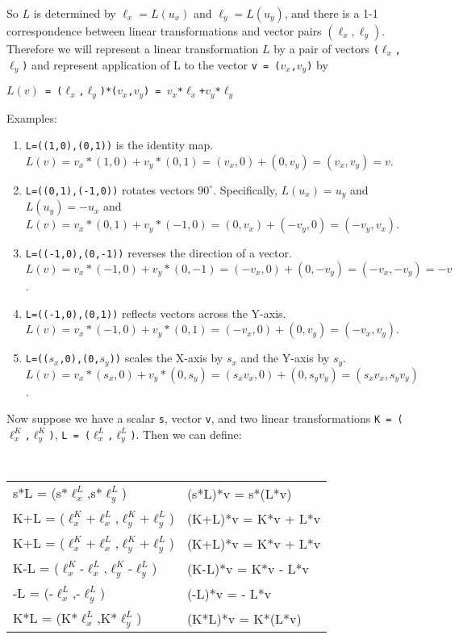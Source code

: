 \documentclass[12pt]{article}
\begin{document}
So $L$ is determined by $\ell_x = L(u_x)$ and $\ell_y = L(u_y)$,
and there is a 1-1 correspondence between linear transformations
and vector pairs $(\ell_x,\ell_y)$.  Therefore we will represent a linear
transformation $L$ by a pair of vectors {\tt ($\ell_x$,$\ell_y$)}
and represent application of L to the vector {\tt v = ($v_x$,$v_y$)} by \\
\centerline{\tt $L(v)$ = ($\ell_x$,$\ell_y$)*($v_x$,$v_y$) =
             $v_x$*$\ell_x$+$v_y$*$\ell_y$}

Examples:
\begin{enumerate}
\item {\tt L=((1,0),(0,1))} is the identity map.
$L(v)=v_x*(1,0) + v_y*(0,1) = (v_x,0)+(0,v_y) = (v_x,v_y) = v$.
\item {\tt L=((0,1),(-1,0))} rotates vectors $90^\circ$.
Specifically, $L(u_x)=u_y$ and $L(u_y)=-u_x$ and
$L(v)=v_x*(0,1) + v_y*(-1,0) = (0,v_x)+(-v_y,0) = (-v_y,v_x)$.
\item {\tt L=((-1,0),(0,-1))} reverses the direction of a vector.
$L(v)=v_x*(-1,0) + v_y*(0,-1) = (-v_x,0)+(0,-v_y) = (-v_x,-v_y) = -v$.
\item {\tt L=((-1,0),(0,1))} reflects vectors across the Y-axis.
$L(v)=v_x*(-1,0) + v_y*(0,1) = (-v_x,0)+(0,v_y) = (-v_x,v_y)$.
\item {\tt L=(($s_x$,0),(0,$s_y$))} scales the X-axis by $s_x$ and
the Y-axis by $s_y$. \\
$L(v)=v_x*(s_x,0) + v_y*(0,s_y)
     = (s_x v_x,0)+(0,s_y v_y)= (s_x v_x, s_y v_y)$.
\end{enumerate}

Now suppose we have a scalar {\tt s}, vector {\tt v},
and two linear transformations
{\tt K = ($\ell^K_x$,$\ell^K_y$)},
{\tt L = ($\ell^L_x$,$\ell^L_y$)}.  Then we can define:
\begin{center}
\tt
\begin{tabular}{l@{~so that~}l}
s*L = (s*$\ell^L_x$,s*$\ell^L_y$)
	 & (s*L)*v = s*(L*v) \\[0.3ex]
K+L = ($\ell^K_x$+$\ell^L_x$,$\ell^K_y$+$\ell^L_y$)
	 & (K+L)*v = K*v + L*v \\[0.3ex]
K+L = ($\ell^K_x$+$\ell^L_x$,$\ell^K_y$+$\ell^L_y$)
	 & (K+L)*v = K*v + L*v \\[0.3ex]
K-L = ($\ell^K_x$-$\ell^L_x$,$\ell^K_y$-$\ell^L_y$)
	 & (K-L)*v = K*v - L*v \\[0.3ex]
-L = (-$\ell^L_x$,-$\ell^L_y$)
	 & (-L)*v = - L*v \\[0.3ex]
K*L = (K*$\ell^L_x$,K*$\ell^L_y$)
	 & (K*L)*v = K*(L*v)
\end{tabular}
\end{center}
\end{document}

